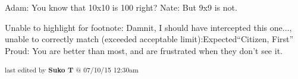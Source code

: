 Adam: You know that 10x10 is 100 right?
Nate: But 9x9 is not.

	Unable to highlight for footnote: Damnit, I should have intercepted this one..., unable to correctly match (exceeded acceptable limit):Expected“Citizen, First”
 Proud: You are better than most, and are frustrated when they don’t see it.


\fi

\vspace{\fill}

\begin{flushright}
\textsubscript{last edited by \textbf{Suko T} @ 07/10/15 12:30am}
\end{flushright}

